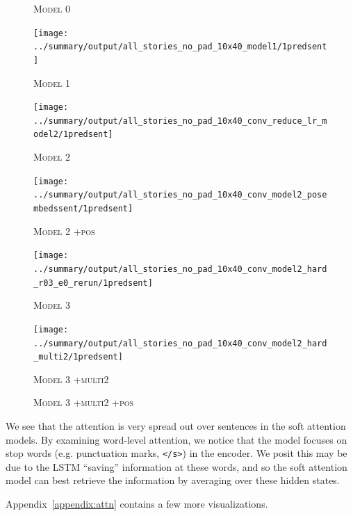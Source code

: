 \documentclass[12pt]{report}
\begin{document}
\begin{figure}[p]
\centering
\caption{\textsc{Model 0}}
\end{figure}

\begin{figure}[p]
\centering
\texttt{[image: ../summary/output/all\_stories\_no\_pad\_10x40\_model1/1predsent]}
\caption{\textsc{Model 1}}
\end{figure}

\begin{figure}[p]
\centering
\texttt{[image: ../summary/output/all\_stories\_no\_pad\_10x40\_conv\_reduce\_lr\_model2/1predsent]}
\caption{\textsc{Model 2}}
\end{figure}

\begin{figure}[p]
\centering
\texttt{[image: ../summary/output/all\_stories\_no\_pad\_10x40\_conv\_model2\_posembedssent/1predsent]}
\caption{\textsc{Model 2 +pos}}
\end{figure}

\begin{figure}[p]
\centering
\texttt{[image: ../summary/output/all\_stories\_no\_pad\_10x40\_conv\_model2\_hard\_r03\_e0\_rerun/1predsent]}
\caption{\textsc{Model 3}}
\end{figure}

\begin{figure}[p]
\centering
\texttt{[image: ../summary/output/all\_stories\_no\_pad\_10x40\_conv\_model2\_hard\_multi2/1predsent]}
\caption{\textsc{Model 3 +multi2}}
\end{figure}

\begin{figure}[p]
\centering
\caption{\textsc{Model 3 +multi2 +pos}}
\end{figure}


We see that the attention is very spread out over sentences in the soft attention models. By examining word-level attention, we notice that the model focuses on stop words (e.g. punctuation marks, \texttt{</s>}) in the encoder. We posit this may be due to the LSTM ``saving'' information at these words, and so the soft attention model can best retrieve the information by averaging over these hidden states.

Appendix~\ref{appendix:attn} contains a few more visualizations.
\end{document}
